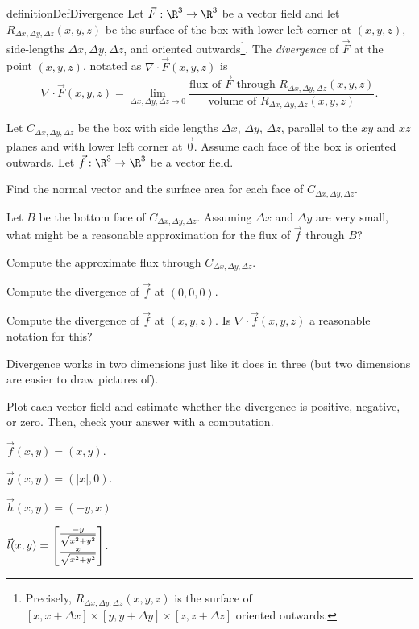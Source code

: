 \begin{restatable*}[Divergence]{definition}{DefDivergence}
	Let $\vec F:\R^3\to\R^3$ be a vector field and let $R_{\Delta x,\Delta y,\Delta z}(x,y,z)$
	be the surface of the box with lower left corner at $(x,y,z)$,
	side-lengths $\Delta x,\Delta y,\Delta z$,
	and oriented outwards\footnote{ Precisely, $R_{\Delta x,\Delta y,\Delta z}(x,y,z)$
	is the surface of  $[x,x+\Delta x]\times[y,y+\Delta y]\times[z,z+\Delta z]$ oriented outwards.}.
	The \emph{divergence} of $\vec F$ at the point $(x,y,z)$, notated as $\nabla \cdot \vec F(x,y,z)$
	is
	\[
		\nabla \cdot \vec F(x,y,z) = \lim_{\Delta x,\Delta y,\Delta z\to 0}
		\frac{\text{flux of }\vec F\text{ through }R_{\Delta x,\Delta y,\Delta z}(x,y,z)}
		{\text{volume of }
		R_{\Delta x,\Delta y,\Delta z}(x,y,z)}.
	\]
\end{restatable*}

\begin{question}
	Let $C_{\Delta x,\Delta y,\Delta z}$ be the box with side lengths
	$\Delta x$, $\Delta y$, $\Delta z$, parallel to the $xy$ and $xz$ planes
	and with lower left corner at $\vec 0$.  Assume each face of the box is
	oriented outwards.
	Let $\vec f:\R^3\to\R^3$ be
	a vector field.
	\begin{parts}
		\item Find the normal vector and the surface area for each face of $C_{\Delta x,\Delta y,\Delta z}$.
		\item Let $B$ be the bottom face of $C_{\Delta x,\Delta y,\Delta z}$.  Assuming
			$\Delta x$ and $\Delta y$ are very small, what might be a reasonable
			approximation for the flux of $\vec f$ through $B$?
		\item Compute the approximate flux through $C_{\Delta x,\Delta y,\Delta z}$.
		\item Compute the divergence of $\vec f$ at $(0,0,0)$.
		\item Compute the divergence of $\vec f$ at $(x,y,z)$.  Is $\nabla \cdot \vec f(x,y,z)$ a reasonable
			notation for this?
	\end{parts}
\end{question}

	Divergence works in two dimensions just like it does in three (but two dimensions are
	easier to draw pictures of).

\begin{question}
	Plot each vector field and estimate whether the divergence is positive,
	negative, or zero.  Then, check your answer with a computation.
	\begin{parts}
		\item $\vec f(x,y) = (x,y)$.
		\item $\vec g(x,y) = (|x|, 0)$.
		\item $\vec h(x,y) = (-y,x)$
		\item $\vec l(x,y) = \mat{\frac{-y}{\sqrt{x^2+y^2}}\\\frac{x}{\sqrt{x^2+y^2}}}$.
	\end{parts}
\end{question}

